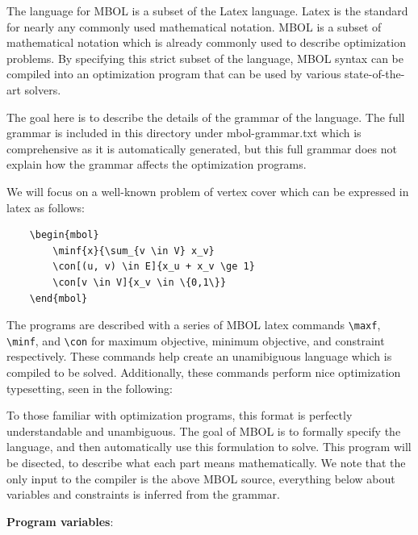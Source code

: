 \documentclass{article}
\newcommand{\subheader}[1]{
    \vspace{0.5in}
    \noindent\textbf{#1}:
}
\newcommand{\hil}[1]{\textcolor{red}{#1}}
\begin{document}
The language for MBOL is a subset of the Latex language. Latex is the standard for nearly any commonly used mathematical notation. MBOL is a subset of mathematical notation which is already commonly used to describe optimization problems. By specifying this strict subset of the language, MBOL syntax can be compiled into an optimization program that can be used by various state-of-the-art solvers.

The goal here is to describe the details of the grammar of the language. The full grammar is included in this directory under mbol-grammar.txt which is comprehensive as it is automatically generated, but this full grammar does not explain how the grammar affects the optimization programs.


We will focus on a well-known problem of vertex cover which can be expressed in latex as follows:

\begin{verbatim}
    \begin{mbol}
        \minf{x}{\sum_{v \in V} x_v}
        \con[(u, v) \in E]{x_u + x_v \ge 1}
        \con[v \in V]{x_v \in \{0,1\}}
    \end{mbol}
\end{verbatim}

The programs are described with a series of MBOL latex commands \texttt{\textbackslash maxf}, \texttt{\textbackslash minf}, and \texttt{\textbackslash con} for maximum objective, minimum objective, and constraint respectively. These commands help create an unamibiguous language which is compiled to be solved. Additionally, these commands perform nice optimization typesetting, seen in the following:

\begin{mbol}
\end{mbol}

To those familiar with optimization programs, this format is perfectly understandable and unambiguous. The goal of MBOL is to formally specify the language, and then automatically use this formulation to solve. This program will be disected, to describe what each part means mathematically. We note that the only input to the compiler is the above MBOL source, everything below about variables and constraints is inferred from the grammar.

\subheader{Program variables}

\begin{mbol}
    \minf{\hil{x}}{\sum_{v \in V} x_v}
\end{mbol}
\end{document}
